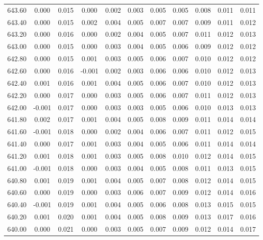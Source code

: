 \begin{longtable}{cccccccccc}
    643.60 &  0.000 &  0.015 &  0.000 &  0.002 &  0.003 &  0.005 &  0.005 &  0.008 &  0.011 &  0.011 \\
    643.40 &  0.000 &  0.015 &  0.002 &  0.004 &  0.005 &  0.007 &  0.007 &  0.009 &  0.011 &  0.012 \\
    643.20 &  0.000 &  0.016 &  0.000 &  0.002 &  0.004 &  0.005 &  0.007 &  0.011 &  0.012 &  0.013 \\
    643.00 &  0.000 &  0.015 &  0.000 &  0.003 &  0.004 &  0.005 &  0.006 &  0.009 &  0.012 &  0.012 \\
    642.80 &  0.000 &  0.015 &  0.001 &  0.003 &  0.005 &  0.006 &  0.007 &  0.010 &  0.012 &  0.012 \\
    642.60 &  0.000 &  0.016 & -0.001 &  0.002 &  0.003 &  0.006 &  0.006 &  0.010 &  0.012 &  0.013 \\
    642.40 &  0.001 &  0.016 &  0.001 &  0.004 &  0.005 &  0.006 &  0.007 &  0.010 &  0.012 &  0.013 \\
    642.20 &  0.000 &  0.017 &  0.000 &  0.003 &  0.005 &  0.006 &  0.007 &  0.011 &  0.012 &  0.013 \\
    642.00 & -0.001 &  0.017 &  0.000 &  0.003 &  0.003 &  0.005 &  0.006 &  0.010 &  0.013 &  0.013 \\
    641.80 &  0.002 &  0.017 &  0.001 &  0.004 &  0.005 &  0.008 &  0.009 &  0.011 &  0.014 &  0.014 \\
    641.60 & -0.001 &  0.018 &  0.000 &  0.002 &  0.004 &  0.006 &  0.007 &  0.011 &  0.012 &  0.015 \\
    641.40 &  0.000 &  0.017 &  0.001 &  0.003 &  0.004 &  0.005 &  0.006 &  0.011 &  0.014 &  0.014 \\
    641.20 &  0.001 &  0.018 &  0.001 &  0.003 &  0.005 &  0.008 &  0.010 &  0.012 &  0.014 &  0.015 \\
    641.00 & -0.001 &  0.018 &  0.000 &  0.003 &  0.004 &  0.005 &  0.008 &  0.011 &  0.013 &  0.015 \\
    640.80 &  0.001 &  0.019 &  0.001 &  0.004 &  0.005 &  0.007 &  0.008 &  0.012 &  0.014 &  0.015 \\
    640.60 &  0.000 &  0.019 &  0.000 &  0.003 &  0.006 &  0.007 &  0.009 &  0.012 &  0.014 &  0.016 \\
    640.40 & -0.001 &  0.019 &  0.001 &  0.004 &  0.005 &  0.006 &  0.008 &  0.013 &  0.015 &  0.015 \\
    640.20 &  0.001 &  0.020 &  0.001 &  0.004 &  0.005 &  0.008 &  0.009 &  0.013 &  0.017 &  0.016 \\
    640.00 &  0.000 &  0.021 &  0.000 &  0.003 &  0.005 &  0.007 &  0.009 &  0.012 &  0.014 &  0.017 \\

\end{longtable}
